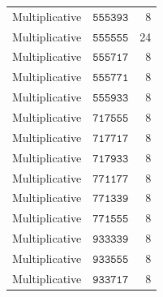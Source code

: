 \begin{table}[!htbp]
\begin{tabular}{@{}llr@{}}
Multiplicative&\(\mathtt{555393}\)&8\\
Multiplicative&\(\mathtt{555555}\)&24\\
Multiplicative&\(\mathtt{555717}\)&8\\
Multiplicative&\(\mathtt{555771}\)&8\\
Multiplicative&\(\mathtt{555933}\)&8\\
Multiplicative&\(\mathtt{717555}\)&8\\
Multiplicative&\(\mathtt{717717}\)&8\\
Multiplicative&\(\mathtt{717933}\)&8\\
Multiplicative&\(\mathtt{771177}\)&8\\
Multiplicative&\(\mathtt{771339}\)&8\\
Multiplicative&\(\mathtt{771555}\)&8\\
Multiplicative&\(\mathtt{933339}\)&8\\
Multiplicative&\(\mathtt{933555}\)&8\\
Multiplicative&\(\mathtt{933717}\)&8\\
\bottomrule
\end{tabular}\end{table}
